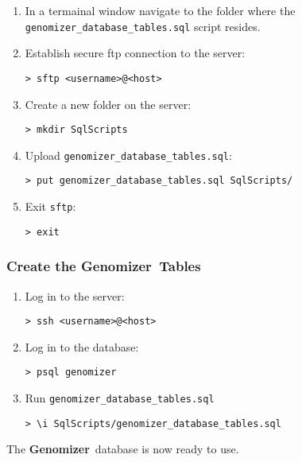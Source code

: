 \documentclass[a4paper]{report}
\newcommand{\appName}{\textbf{Genomizer}}
\begin{document}
    \begin{enumerate}

      \item In a termainal window navigate to the folder where the \verb+genomizer_database_tables.sql+ script resides.

      \item Establish secure ftp connection to the server:
      \begin{verbatim}
> sftp <username>@<host>
      \end{verbatim}

      \item Create a new folder on the server:
      \begin{verbatim}
> mkdir SqlScripts
      \end{verbatim}

      \item Upload \verb+genomizer_database_tables.sql+:
      \begin{verbatim}
> put genomizer_database_tables.sql SqlScripts/
      \end{verbatim}

      \item Exit \texttt{sftp}:
      \begin{verbatim}
> exit
      \end{verbatim}

    \end{enumerate}

    \subsubsection{Create the \appName\ Tables}

    \begin{enumerate}

      \item Log in to the server:
      \begin{verbatim}
> ssh <username>@<host>
      \end{verbatim}

      \item Log in to the database:
      \begin{verbatim}
> psql genomizer
      \end{verbatim}

      \item Run \verb+genomizer_database_tables.sql+
      \begin{verbatim}
> \i SqlScripts/genomizer_database_tables.sql
      \end{verbatim}


    \end{enumerate}

The \appName\ database is now ready to use.

  
\end{document}
